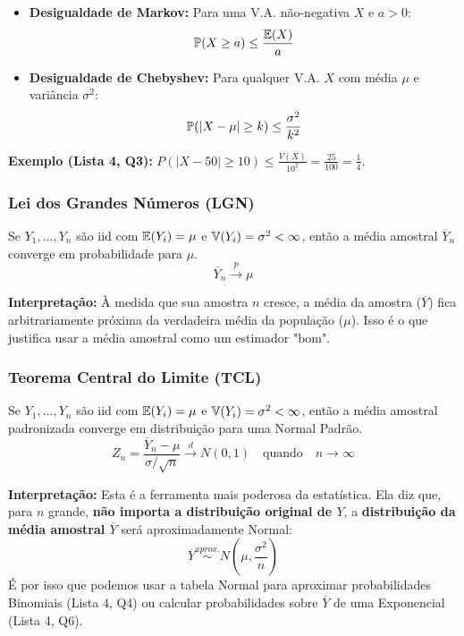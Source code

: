 \begin{itemize}
    \item \textbf{Desigualdade de Markov:} Para uma V.A. não-negativa $X$ e $a > 0$:
        $$ \mathbb{P}(X \ge a) \le \frac{\mathbb{E}(X)}{a} $$
    \item \textbf{Desigualdade de Chebyshev:} Para qualquer V.A. $X$ com média $\mu$ e variância $\sigma^2$:
        $$ \mathbb{P}(|X - \mu| \ge k) \le \frac{\sigma^2}{k^2} $$
\end{itemize}
\textbf{Exemplo (Lista 4, Q3):} $P(|X - 50| \ge 10) \le \frac{V(X)}{10^2} = \frac{25}{100} = \frac{1}{4}$.

\subsubsection{Lei dos Grandes Números (LGN)}
\begin{teorema}
Se $Y_1, ..., Y_n$ são iid com $\mathbb{E}(Y_i) = \mu$ e $\mathbb{V}(Y_i) = \sigma^2 < \infty$, então a média amostral $\overline{Y}_n$ converge em probabilidade para $\mu$.
$$ \overline{Y}_n \xrightarrow{p} \mu $$
\end{teorema}
\textbf{Interpretação:} À medida que sua amostra $n$ cresce, a média da amostra ($\overline{Y}$) fica arbitrariamente próxima da verdadeira média da população ($\mu$). Isso é o que justifica usar a média amostral como um estimador "bom".

\subsubsection{Teorema Central do Limite (TCL)}
\begin{teorema}
Se $Y_1, ..., Y_n$ são iid com $\mathbb{E}(Y_i) = \mu$ e $\mathbb{V}(Y_i) = \sigma^2 < \infty$, então a média amostral padronizada converge em distribuição para uma Normal Padrão.
$$ Z_n = \frac{\overline{Y}_n - \mu}{\sigma / \sqrt{n}} \xrightarrow{d} N(0, 1) \quad \text{quando} \quad n \to \infty $$
\end{teorema}
\textbf{Interpretação:} Esta é a ferramenta mais poderosa da estatística. Ela diz que, para $n$ grande, \textbf{não importa a distribuição original de $Y$}, a \textbf{distribuição da média amostral $\overline{Y}$} será aproximadamente Normal:
$$ \overline{Y} \stackrel{aprox.}{\sim} N\left(\mu, \frac{\sigma^2}{n}\right) $$
É por isso que podemos usar a tabela Normal para aproximar probabilidades Binomiais (Lista 4, Q4) ou calcular probabilidades sobre $\overline{Y}$ de uma Exponencial (Lista 4, Q6).

